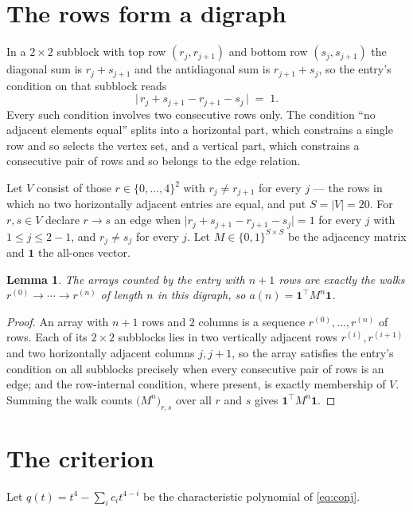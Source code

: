 \documentclass[11pt,a4paper]{article}
\theoremstyle{plain}
\newtheorem{lemma}[theorem]{Lemma}
\theoremstyle{definition}
\begin{document}
\section{The rows form a digraph}

In a $2\times2$ subblock with top row $(r_j,r_{j+1})$ and bottom row $(s_j,s_{j+1})$ the
diagonal sum is $r_j+s_{j+1}$ and the antidiagonal sum is $r_{j+1}+s_j$, so the entry's
condition on that subblock reads
\[
\bigl|\,r_j+s_{j+1}-r_{j+1}-s_j\,\bigr|\;=\;1.
\]
Every such condition involves two consecutive rows only. The condition ``no adjacent elements equal'' splits into a horizontal
part, which constrains a single row and so selects the vertex set, and a vertical part,
which constrains a consecutive pair of rows and so belongs to the edge relation.

Let $V$ consist of those $r\in\{0,\dots,4\}^{2}$ with $r_j\ne r_{j+1}$ for every
$j$ --- the rows in which no two horizontally adjacent entries are equal, and put $S=|V|=20$. For $r,s\in V$ declare $r\to s$ an edge
when $\bigl|r_j+s_{j+1}-r_{j+1}-s_j\bigr|=1$ for every $j$ with
$1\le j\le2-1$, and $r_j\ne s_j$ for every $j$. Let $M\in\{0,1\}^{S\times S}$ be the adjacency matrix and $\mathbf{1}$
the all-ones vector.

\begin{lemma}\label{lem:walk}
The arrays counted by the entry with $n+1$ rows are exactly the walks
$r^{(0)}\to\cdots\to r^{(n)}$ of length $n$ in this digraph, so
$a(n)=\mathbf{1}^{\!\top}M^{n}\mathbf{1}$.
\end{lemma}

\begin{proof}
An array with $n+1$ rows and $2$ columns is a sequence $r^{(0)},\dots,r^{(n)}$ of
rows. Each of its $2\times2$ subblocks lies in two vertically adjacent rows
$r^{(i)},r^{(i+1)}$ and two horizontally adjacent columns $j,j+1$, so the array satisfies
the entry's condition on all subblocks precisely when every consecutive pair of rows is an
edge; and the row-internal condition, where present, is exactly membership of $V$. Summing
the walk counts $\bigl(M^{n}\bigr)_{r,s}$ over all $r$ and $s$ gives
$\mathbf{1}^{\!\top}M^{n}\mathbf{1}$.
\end{proof}

\section{The criterion}

Let $q(t)=t^{4}-\sum_i c_i t^{4-i}$ be the characteristic polynomial of
\eqref{eq:conj}.
\end{document}
